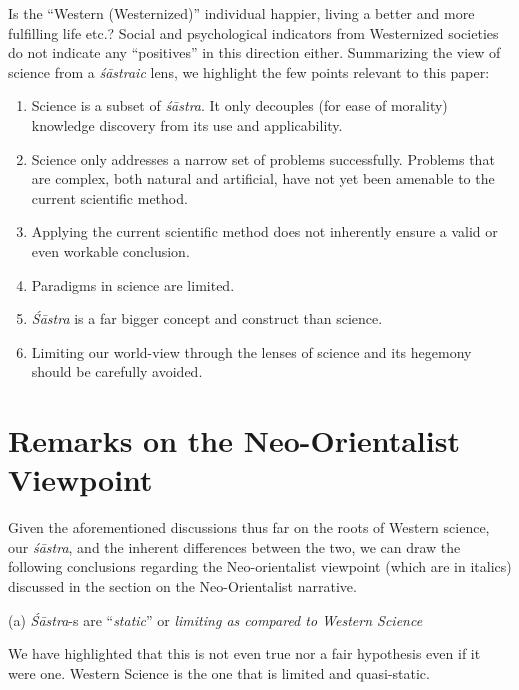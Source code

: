 Is the “Western (Westernized)” individual happier, living a better and more fulfilling life etc.? Social and psychological indicators from Westernized societies do not indicate any “positives” in this direction either. Summarizing the view of science from a \textit{śāstraic} lens, we highlight the few points relevant to this paper:

\begin{enumerate}
\item Science is a subset of \textit{śāstra}. It only decouples (for ease of morality) knowledge discovery from its use and applicability.

 \item Science only addresses a narrow set of problems successfully. Problems that are complex, both natural and artificial, have not yet been amenable to the current scientific method.

 \item Applying the current scientific method does not inherently ensure a valid or even workable conclusion.

 \item Paradigms in science are limited.

 \item \textit{Śāstra} is a far bigger concept and construct than science.

 \item Limiting our world-view through the lenses of science and its hegemony should be carefully avoided.

\end{enumerate}


\section*{Remarks on the Neo-Orientalist Viewpoint}

Given the aforementioned discussions thus far on the roots of Western science, our \textit{śāstra}, and the inherent differences between the two, we can draw the following conclusions regarding the Neo-orientalist viewpoint (which are in italics) discussed in the section on the Neo-Orientalist narrative.

(a) \textit{Śāstra}-s are “\textit{static}” or \textit{limiting as compared to Western Science}

We have highlighted that this is not even true nor a fair hypothesis even if it were one. Western Science is the one that is limited and quasi-static.

